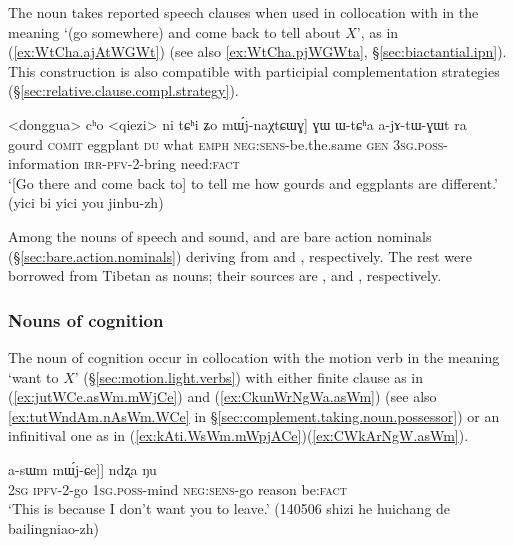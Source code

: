 The noun  takes reported speech clauses when used in collocation with  in the meaning `(go somewhere) and come back to tell about $X$', as in (\ref{ex:WtCha.ajAtWGWt}) (see also \ref{ex:WtCha.pjWGWta}, §\ref{sec:biactantial.ipn}). This construction is also compatible with participial complementation strategies  (§\ref{sec:relative.clause.compl.strategy}).

\begin{exe}
\ex  \label{ex:WtCha.ajAtWGWt}
\gll <donggua> cʰo <qiezi> ni tɕʰi ʑo mɯ́j-naχtɕɯɣ] ɣɯ ɯ-tɕʰa a-jɤ-tɯ-ɣɯt ra \\
gourd \textsc{comit} eggplant \textsc{du} what \textsc{emph} \textsc{neg}:\textsc{sens}-be.the.same \textsc{gen} \textsc{3sg}.\textsc{poss}-information \textsc{irr}-\textsc{pfv}-2-bring need:\textsc{fact} \\
\glt `[Go there and come back to] to tell me how gourds and eggplants are different.' (yici bi yici you jinbu-zh)
\end{exe}

Among the nouns of speech and sound,   and  are bare action nominals (§\ref{sec:bare.action.nominals}) deriving from  and , respectively. The rest were borrowed from Tibetan as nouns; their sources are ,  and , respectively.

\subsubsection{Nouns of cognition} \label{sec:nouns.cognition.complement}
The noun of cognition  occur in collocation with the motion verb  in the meaning `want to $X$' (§\ref{sec:motion.light.verbs}) with either finite clause as in (\ref{ex:jutWCe.asWm.mWjCe}) and (\ref{ex:CkunWrNgWa.asWm}) (see also \ref{ex:tutWndAm.nAsWm.WCe} in §\ref{sec:complement.taking.noun.possessor}) or an infinitival one as in (\ref{ex:kAti.WsWm.mWpjACe})(\ref{ex:CWkArNgW.asWm}).


\begin{exe}
\ex  \label{ex:jutWCe.asWm.mWjCe}
\gll [[nɤʑo ju-tɯ-ɕe] a-sɯm mɯ́j-ɕe]] ndʐa ŋu \\
\textsc{2sg} \textsc{ipfv}-2-go \textsc{1sg}.\textsc{poss}-mind \textsc{neg}:\textsc{sens}-go reason be:\textsc{fact} \\
\glt `This is because I don't want you to leave.' (140506 shizi he huichang de bailingniao-zh)
\end{exe}

